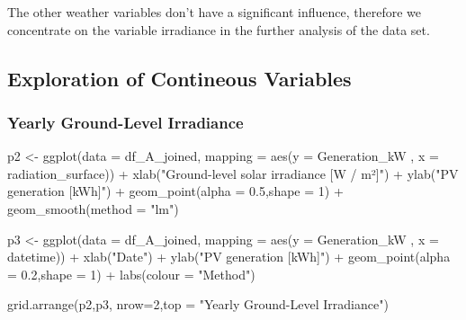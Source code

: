 \documentclass[
]{article}
\newenvironment{Shaded}{\begin{snugshade}}{\end{snugshade}}
\newcommand{\AttributeTok}[1]{\textcolor[rgb]{0.77,0.63,0.00}{#1}}
\newcommand{\DecValTok}[1]{\textcolor[rgb]{0.00,0.00,0.81}{#1}}
\newcommand{\FloatTok}[1]{\textcolor[rgb]{0.00,0.00,0.81}{#1}}
\newcommand{\FunctionTok}[1]{\textcolor[rgb]{0.00,0.00,0.00}{#1}}
\newcommand{\NormalTok}[1]{#1}
\newcommand{\OtherTok}[1]{\textcolor[rgb]{0.56,0.35,0.01}{#1}}
\newcommand{\SpecialCharTok}[1]{\textcolor[rgb]{0.00,0.00,0.00}{#1}}
\newcommand{\StringTok}[1]{\textcolor[rgb]{0.31,0.60,0.02}{#1}}
\begin{document}
The other weather variables don't have a significant influence,
therefore we concentrate on the variable irradiance in the further
analysis of the data set.

\newpage

\hypertarget{exploration-of-contineous-variables}{%
\subsection{Exploration of Contineous
Variables}\label{exploration-of-contineous-variables}}

\hypertarget{yearly-ground-level-irradiance}{%
\subsubsection{Yearly Ground-Level
Irradiance}\label{yearly-ground-level-irradiance}}

\begin{Shaded}
\begin{Highlighting}[]
\NormalTok{p2 }\OtherTok{\textless{}{-}}  \FunctionTok{ggplot}\NormalTok{(}\AttributeTok{data =}\NormalTok{ df\_A\_joined,}
         \AttributeTok{mapping =} \FunctionTok{aes}\NormalTok{(}\AttributeTok{y =}\NormalTok{ Generation\_kW ,}
                     \AttributeTok{x =}\NormalTok{ radiation\_surface)) }\SpecialCharTok{+} 
  \FunctionTok{xlab}\NormalTok{(}\StringTok{"Ground{-}level solar irradiance [W / m²]"}\NormalTok{) }\SpecialCharTok{+} 
  \FunctionTok{ylab}\NormalTok{(}\StringTok{"PV generation [kWh]"}\NormalTok{) }\SpecialCharTok{+} 
     \FunctionTok{geom\_point}\NormalTok{(}\AttributeTok{alpha =} \FloatTok{0.5}\NormalTok{,}\AttributeTok{shape =} \DecValTok{1}\NormalTok{) }\SpecialCharTok{+}
     \FunctionTok{geom\_smooth}\NormalTok{(}\AttributeTok{method =} \StringTok{"lm"}\NormalTok{) }

\NormalTok{p3 }\OtherTok{\textless{}{-}}  \FunctionTok{ggplot}\NormalTok{(}\AttributeTok{data =}\NormalTok{ df\_A\_joined,}
         \AttributeTok{mapping =} \FunctionTok{aes}\NormalTok{(}\AttributeTok{y =}\NormalTok{ Generation\_kW ,}
                     \AttributeTok{x =}\NormalTok{ datetime)) }\SpecialCharTok{+} \FunctionTok{xlab}\NormalTok{(}\StringTok{"Date"}\NormalTok{) }\SpecialCharTok{+} \FunctionTok{ylab}\NormalTok{(}\StringTok{"PV generation [kWh]"}\NormalTok{) }\SpecialCharTok{+} 
     \FunctionTok{geom\_point}\NormalTok{(}\AttributeTok{alpha =} \FloatTok{0.2}\NormalTok{,}\AttributeTok{shape =} \DecValTok{1}\NormalTok{) }\SpecialCharTok{+}
     \FunctionTok{labs}\NormalTok{(}\AttributeTok{colour =} \StringTok{"Method"}\NormalTok{)}

\FunctionTok{grid.arrange}\NormalTok{(p2,p3, }\AttributeTok{nrow=}\DecValTok{2}\NormalTok{,}\AttributeTok{top =} \StringTok{"Yearly Ground{-}Level Irradiance"}\NormalTok{)}
\end{Highlighting}
\end{Shaded}
\end{document}

